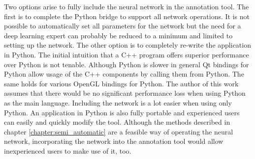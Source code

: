 Two options arise to fully include the neural network in the annotation tool. The first is to complete the Python bridge to support all network operations. It is not possible to automatically set all parameters for the network but the need for a deep learning expert can probably be reduced to a minimum and limited to setting up the network. The other option is to completely re-write the application in Python. The initial intuition that a C++ program offers superior performance over Python is not tenable. Although Python is slower in general Qt bindings for Python allow usage of the C++ components by calling them from Python. The same holds for various OpenGL bindings for Python. The author of this work assumes that there would be no significant  performance loss when using Python as the main language. Including the network is a lot easier when using only Python. An application in Python is also fully portable and experienced users can easily and quickly modify the tool. Although the methods described in chapter \ref{chapter:semi_automatic} are a feasible way of operating the neural network, incorporating the network into the annotation tool would allow inexperienced users to make use of it, too.